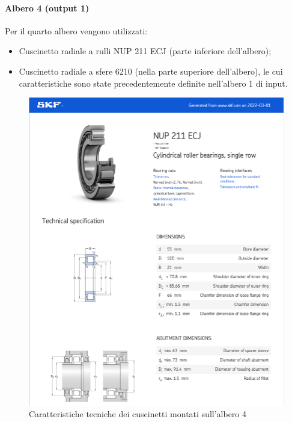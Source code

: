 \paragraph{Albero 4 (output 1)}
Per il quarto albero vengono utilizzati:
\begin{itemize}
    \item Cuscinetto radiale a rulli NUP 211 ECJ (parte inferiore dell’albero);
    \item Cuscinetto radiale a sfere 6210 (nella parte superiore dell’albero), le cui caratteristiche sono state precedentemente definite nell’albero 1 di input. 
\end{itemize}
\newpage
\begin{figure}[h]
    \centering
    \includegraphics[scale=0.6]{Immagini/Cuscinetti1Albero4.png}
    \caption{Caratteristiche tecniche dei cuscinetti montati sull'albero 4}
    \label{fig:Cuscinetti1Albero4}
\end{figure}
\newpage
